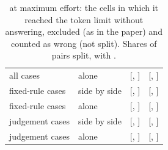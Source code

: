 \begin{table}[t]
\begin{tabular}{llcc}
all cases & alone & \VoidCheckExcludedAloneHaikuFiveFiveMaxEffort{} [\VoidCheckExcludedAloneHaikuFiveFiveMaxEffortLo{}, \VoidCheckExcludedAloneHaikuFiveFiveMaxEffortHi{}] & \VoidCheckWrongAloneHaikuFiveFiveMaxEffort{} [\VoidCheckWrongAloneHaikuFiveFiveMaxEffortLo{}, \VoidCheckWrongAloneHaikuFiveFiveMaxEffortHi{}] \\
fixed-rule cases & side by side & \VoidCheckExcludedSideBySideHaikuFiveFiveMaxEffortFixedRule{} [\VoidCheckExcludedSideBySideHaikuFiveFiveMaxEffortFixedRuleLo{}, \VoidCheckExcludedSideBySideHaikuFiveFiveMaxEffortFixedRuleHi{}] & \VoidCheckWrongSideBySideHaikuFiveFiveMaxEffortFixedRule{} [\VoidCheckWrongSideBySideHaikuFiveFiveMaxEffortFixedRuleLo{}, \VoidCheckWrongSideBySideHaikuFiveFiveMaxEffortFixedRuleHi{}] \\
fixed-rule cases & alone & \VoidCheckExcludedAloneHaikuFiveFiveMaxEffortFixedRule{} [\VoidCheckExcludedAloneHaikuFiveFiveMaxEffortFixedRuleLo{}, \VoidCheckExcludedAloneHaikuFiveFiveMaxEffortFixedRuleHi{}] & \VoidCheckWrongAloneHaikuFiveFiveMaxEffortFixedRule{} [\VoidCheckWrongAloneHaikuFiveFiveMaxEffortFixedRuleLo{}, \VoidCheckWrongAloneHaikuFiveFiveMaxEffortFixedRuleHi{}] \\
judgement cases & side by side & \VoidCheckExcludedSideBySideHaikuFiveFiveMaxEffortJudgement{} [\VoidCheckExcludedSideBySideHaikuFiveFiveMaxEffortJudgementLo{}, \VoidCheckExcludedSideBySideHaikuFiveFiveMaxEffortJudgementHi{}] & \VoidCheckWrongSideBySideHaikuFiveFiveMaxEffortJudgement{} [\VoidCheckWrongSideBySideHaikuFiveFiveMaxEffortJudgementLo{}, \VoidCheckWrongSideBySideHaikuFiveFiveMaxEffortJudgementHi{}] \\
judgement cases & alone & \VoidCheckExcludedAloneHaikuFiveFiveMaxEffortJudgement{} [\VoidCheckExcludedAloneHaikuFiveFiveMaxEffortJudgementLo{}, \VoidCheckExcludedAloneHaikuFiveFiveMaxEffortJudgementHi{}] & \VoidCheckWrongAloneHaikuFiveFiveMaxEffortJudgement{} [\VoidCheckWrongAloneHaikuFiveFiveMaxEffortJudgementLo{}, \VoidCheckWrongAloneHaikuFiveFiveMaxEffortJudgementHi{}] \\
\bottomrule
\end{tabular}
\caption{ at maximum effort: the \HaikuMaxVoidCells{} cells in which it reached the token limit without answering, excluded (as in the paper) and counted as wrong (not split). Shares of pairs split, with \IntervalsNote{}.}
\label{tab:haiku}
\end{table}
